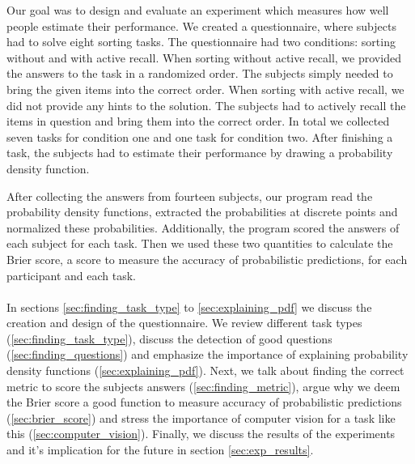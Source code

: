 \documentclass[../main/main.tex]{subfiles}
\begin{document}
	
	\noindent Our goal was to design and evaluate an experiment which measures how well people estimate their performance. We created a questionnaire, where subjects had to solve eight sorting tasks. The questionnaire had two conditions: sorting without and with active recall. When sorting without active recall, we provided the answers to the task in a randomized order. The subjects simply needed to bring the given items into the correct order. When sorting with active recall, we did not provide any hints to the solution. The subjects had to actively recall the items in question and bring them into the correct order. In total we collected seven tasks for condition one and one task for condition two. After finishing a task, the subjects had to estimate their performance by drawing a probability density function. 
	
	After collecting the answers from fourteen subjects, our program read the probability density functions, extracted the probabilities at discrete points and normalized these probabilities. Additionally, the program scored the answers of each subject for each task. Then we used these two quantities to calculate the Brier score, a score to measure the accuracy of probabilistic predictions, for each participant and each task.
	\\\\
	In sections \ref{sec:finding_task_type} to \ref{sec:explaining_pdf} we discuss the creation and design of the questionnaire. We review different task types (\ref{sec:finding_task_type}), discuss the detection of good questions (\ref{sec:finding_questions}) and emphasize the importance of explaining probability density functions (\ref{sec:explaining_pdf}). Next, we talk about finding the correct metric to score the subjects answers (\ref{sec:finding_metric}), argue why we deem the Brier score a good function to measure accuracy of probabilistic predictions (\ref{sec:brier_score}) and stress the importance of computer vision for a task like this (\ref{sec:computer_vision}). Finally, we discuss the results of the experiments and it's implication for the future in section \ref{sec:exp_results}.
	
\end{document}
